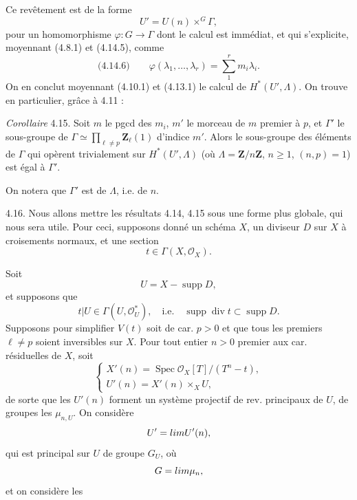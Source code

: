 \documentclass[11pt,a4paper]{article}
\begin{document}

Ce revêtement est de la forme
\[
U' = U(n) \times^{G} \Gamma ,
\]
pour un homomorphisme $\varphi : G \to \Gamma$ dont le calcul est immédiat, et qui \struck{\ill{}} s'explicite, moyennant (4.8.1) et (4.14.5), comme
\[
\text{(4.14.6)} \qquad \varphi(\lambda_1, \ldots, \lambda_r) = \sum_{1}^{r} m_i \lambda_i .
\]
On en conclut moyennant (4.10.1) et (4.13.1) le calcul de $H^*(U', \Lambda)$. On trouve en particulier, grâce à 4.11 :

\emph{Corollaire} 4.15.  Soit $m$ le pgcd des $m_i$, \struck{\ill{}}  $m'$ le morceau de $m$ premier à $p$, et $\Gamma'$  le sous-groupe de $\Gamma \simeq \prod_{\ell \neq p} \mathbf{Z}_\ell(1)$ d'indice $m'$. Alors le sous-groupe des éléments de $\Gamma$ qui opèrent trivialement sur $H^*(U', \Lambda)$ (où $\Lambda = \mathbf{Z}/n\mathbf{Z}$, $n \geqslant 1$, $(n,p) = 1$) est égal à $\Gamma'$. 

On notera que $\Gamma'$ est \emph{} de $\Lambda$, i.e. de $n$.


4.16. Nous allons mettre les résultats 4.14, 4.15 sous une forme \struck{\ill{}} plus globale, qui nous sera utile. Pour ceci, supposons donné un schéma  $X$, un diviseur $D$ sur $X$ à croisements normaux, et une section
\[
t \in \Gamma(X, \mathcal{O}_X) .
\]
 


Soit
\[
U = X - \operatorname{supp} D ,
\]
et supposons que \struck{\ill{}}
\[
t|U \in \Gamma(U, \mathcal{O}_U^*) , \quad \text{i.e.} \quad \operatorname{supp} \operatorname{div} t \subset \operatorname{supp} D .
\]
 Supposons pour simplifier    
$V(t)$ soit de car. $p > 0$ et que tous les premiers $\ell \neq p$ soient inversibles sur $X$. Pour tout  entier $n > 0$ premier aux car. résiduelles de $X$, \struck{\ill{}} soit
\[
\begin{cases}
X'(n) = \operatorname{Spec} \mathcal{O}_X[T]/(T^n - t) , \\
U'(n) = X'(n) \times_X U ,
\end{cases}
\]
de sorte que les $U'(n)$ forment un système projectif de rev.  principaux de $U$, de groupes les $\mu_{n,U}$. On considère
\[
U' = \varprojlim U'(n) ,
\]
qui est principal sur $U$ de groupe  $G_U$, où
\[
G = \varprojlim \mu_n ,
\]
et on considère les  
\end{document}
